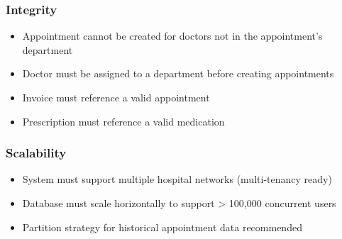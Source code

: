 \subsubsection*{Integrity}
\begin{itemize}
    \item Appointment cannot be created for doctors not in the appointment's department
    \item Doctor must be assigned to a department before creating appointments
    \item Invoice must reference a valid appointment
    \item Prescription must reference a valid medication
\end{itemize}

\subsubsection*{Scalability}
\begin{itemize}
    \item System must support multiple hospital networks (multi-tenancy ready)
    \item Database must scale horizontally to support > 100,000 concurrent users
    \item Partition strategy for historical appointment data recommended
\end{itemize}

